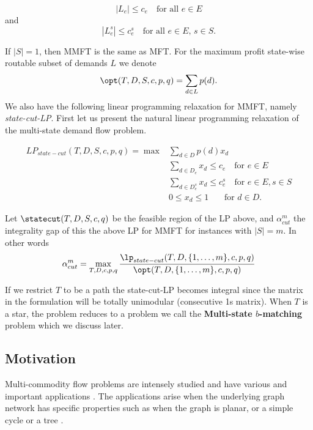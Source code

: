 \begin{equation}
|L_e|\leq c_e \quad \mbox{for all $e\in E$}\end{equation}
and 
\begin{equation}
|L^s_e|\leq c^s_e \quad \mbox{for all $e\in E$, $s\in S$}.\end{equation}


If $|S|=1$, then MMFT is the same as MFT. For the maximum profit state-wise routable subset of demands $L$ we denote $$\opt(T,D,S,c,p,q)= \sum_{d\in L}p(d).$$ We also have the following linear programming relaxation for MMFT, namely \textit{state-cut-LP}. First let us present the natural linear programming relaxation of the multi-state demand flow problem. 



\begin{align}
LP_{state-cut}(T,D,S,c,p,q)=\max&\sum_{d\in D} p(d) x_d\label{obj}\\
&\sum_{d\in D_e}x_d \leq c_e \quad\text{for } e\in E \label{overall}\\
&\sum_{d\in D^s_e}x_d \leq c^s_e \quad\text{for } e\in E, s\in S\label{state}\\
&0\leq x_d \leq 1 \quad\;\;\;\text{for } d\in D \label{nonneg}.
\end{align}

Let $\statecut(T,D,S,c,q)$ be the feasible region of the LP above, and $\alpha^{m}_{cut}$ the integrality gap of this the above LP for MMFT for instances with $|S|=m$. In other words $$\alpha^m_{cut} =\max_{T,D,c,p,q } \frac{\lp_{state-cut}(T,D,\{1,\ldots,m\},c,p,q)}{\opt(T,D,\{1,\ldots,m\},c,p,q)}$$ 

If we restrict $T$ to be a path the state-cut-LP becomes integral since the matrix in the formulation will be totally unimodular (consecutive 1s matrix). When $T$ is a star, the problem reduces to a problem we call the \textbf{Multi-state $b$-matching} problem which we discuss later.


\subsection{Motivation}
Multi-commodity flow problems are intensely studied and have various and important applications \cite{}. The applications arise when the underlying graph network has specific properties such as when the graph is planar, or a simple cycle or a tree \cite{}. 

